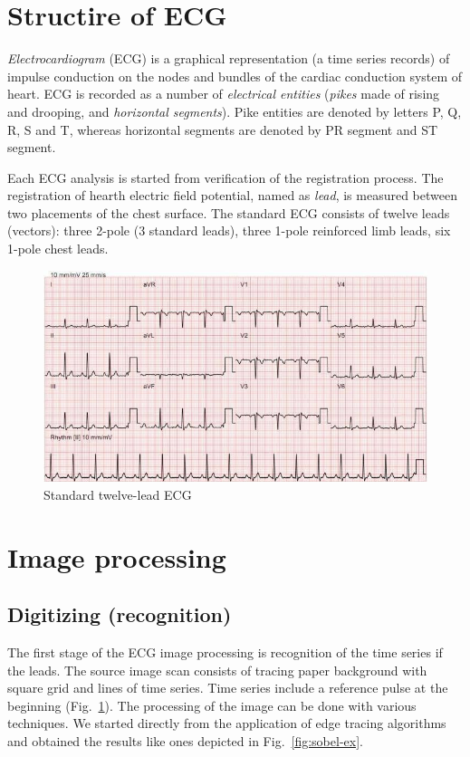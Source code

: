 \documentclass[runningheads]{AIIT}
\begin{document}
\section{Structire of ECG}
\label{sec:structire-ecg}

\emph{Electrocardiogram} (ECG) is a graphical representation (a time series records) of impulse conduction on the nodes and bundles of the cardiac conduction system of heart.  ECG is recorded as a number of \emph{electrical entities} \cite{wikipedia} (\emph{pikes} made of rising and drooping, and \emph{horizontal segments}).  Pike entities are denoted by letters P, Q, R, S and T, whereas horizontal segments are denoted by PR segment and ST segment.

Each ECG analysis is started from verification of the registration process.  The registration of hearth electric field potential, named as \emph{lead}, is measured between two placements of the chest surface.  The standard ECG consists of twelve leads (vectors): three 2-pole (3 standard leads), three 1-pole reinforced limb leads, six 1-pole chest leads.

\begin{figure}[htb]
  \centering
    \includegraphics[width=0.5\linewidth]{images/Stand_ECG.jpg}
  \caption{Standard twelve-lead ECG}
  \label{fig:leads-ex}
\end{figure}

\section{Image processing}
\label{sec:image-processing}

\subsection{Digitizing (recognition)}
\label{sec:digit-recogn}

The first stage of the ECG image processing is recognition of the time series if the leads.  The source image scan consists of tracing paper background with square grid and lines of time series.  Time series include a reference pulse at the beginning (Fig.~\ref{fig:leads-ex}).  The processing of the image can be done with various techniques.  We started directly from the application of edge tracing algorithms and obtained the results like ones depicted in Fig.~\ref{fig:sobel-ex}.
\end{document}
